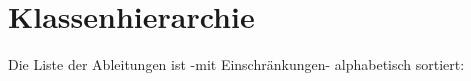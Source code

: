 \section{Klassenhierarchie}
Die Liste der Ableitungen ist -\/mit Einschränkungen-\/ alphabetisch sortiert\+:\begin{DoxyCompactList}
\item {}
\begin{DoxyCompactList}
\item {}
\item {}
\end{DoxyCompactList}
\end{DoxyCompactList}

